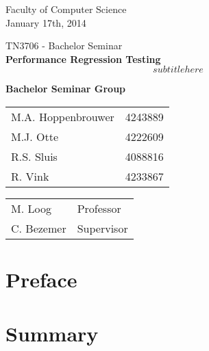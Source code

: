 \documentclass[oneside]{book}
\begin{document}
\frontmatter

\begin{titlepage}

\begin{center}
\begin{figure}[h!]
\centering
\end{figure}
Faculty of Computer Science \\
January 17th, 2014

\vspace{3.5cm}
\selectfont
{\Large TN3706 - Bachelor Seminar}\\
\vspace{0.0cm}
\Huge{\textbf{Performance Regression Testing\\ \[subtitle here\]}}
\vspace{0.5cm}
\selectfont

\vspace{5cm}
\normalsize{\textbf{Bachelor Seminar Group}}

\begin{tabular}{ l r}
\normalsize{M.A. Hoppenbrouwer} & \normalsize{4243889} \\
\normalsize{M.J. Otte} & \normalsize{4222609} \\
\normalsize{R.S. Sluis} & \normalsize{4088816} \\
\normalsize{R. Vink} & \normalsize{4233867}\\
\end{tabular}

\vspace{0.75cm}

\begin{tabular}{ l l }
\normalsize{M. Loog} & \normalsize{Professor} \\
\normalsize{C. Bezemer} & \normalsize{Supervisor} \\
\end{tabular}

\end{center}
\end{titlepage}

\chapter{Preface}
% 

\chapter{Summary}
% 
\end{document}
